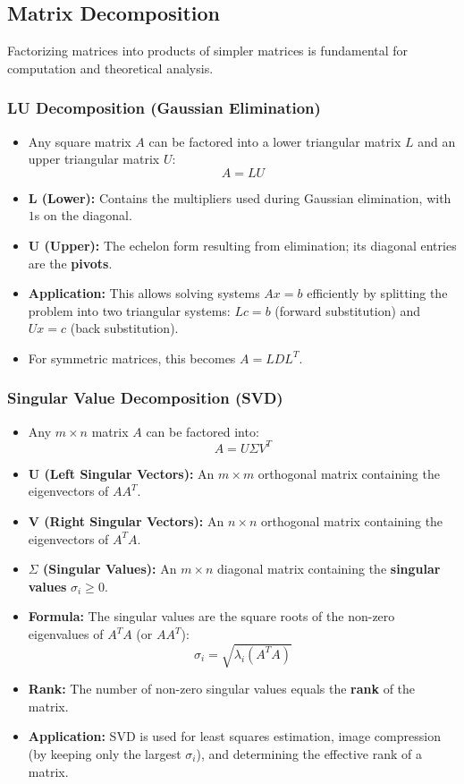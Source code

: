 \documentclass{article}
\begin{document}
\subsection{Matrix Decomposition}
Factorizing matrices into products of simpler matrices is fundamental for computation and theoretical analysis.

\subsubsection{LU Decomposition (Gaussian Elimination)}
\begin{itemize}
    \item Any square matrix $A$ can be factored into a lower triangular matrix $L$ and an upper triangular matrix $U$:
        \[ A = LU \]
    \item \textbf{L (Lower):} Contains the multipliers used during Gaussian elimination, with $1$s on the diagonal.
    \item \textbf{U (Upper):} The echelon form resulting from elimination; its diagonal entries are the \textbf{pivots}.
    \item \textbf{Application:} This allows solving systems $Ax = b$ efficiently by splitting the problem into two triangular systems: $Lc = b$ (forward substitution) and $Ux = c$ (back substitution).
    \item For symmetric matrices, this becomes $A = LDL^T$.
\end{itemize}

\subsubsection{Singular Value Decomposition (SVD)}
\begin{itemize}
    \item Any $m \times n$ matrix $A$ can be factored into:
        \[ A = U \Sigma V^T \]
    \item \textbf{U (Left Singular Vectors):} An $m \times m$ orthogonal matrix containing the eigenvectors of $AA^T$.
    \item \textbf{V (Right Singular Vectors):} An $n \times n$ orthogonal matrix containing the eigenvectors of $A^T A$.
    \item \textbf{$\Sigma$ (Singular Values):} An $m \times n$ diagonal matrix containing the \textbf{singular values} $\sigma_i \ge 0$.
    \item \textbf{Formula:} The singular values are the square roots of the non-zero eigenvalues of $A^T A$ (or $AA^T$):
        \[ \sigma_i = \sqrt{\lambda_i(A^T A)} \]
    \item \textbf{Rank:} The number of non-zero singular values equals the \textbf{rank} of the matrix.
    \item \textbf{Application:} SVD is used for least squares estimation, image compression (by keeping only the largest $\sigma_i$), and determining the effective rank of a matrix.
\end{itemize}
\end{document}
